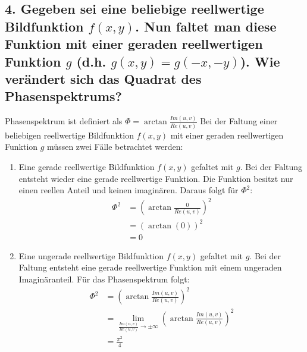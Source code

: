 \subsection*{4. Gegeben sei eine beliebige reellwertige Bildfunktion $f(x,y)$. Nun faltet man diese Funktion mit einer geraden reellwertigen Funktion $g$ (d.h. $g(x,y)=g(-x,-y)$). Wie ver\"andert sich das Quadrat des Phasenspektrums?}
Phasenspektrum ist definiert als $\Phi = \arctan{\frac{Im(u,v)}{Re(u,v)}}$
Bei der Faltung einer beliebigen reellwertige Bildfunktion $f(x,y)$ mit einer geraden reellwertigen Funktion $g$ m\"ussen zwei F\"alle betrachtet werden:
\begin{enumerate}
\item Eine gerade reellwertige Bildfunktion $f(x,y)$ gefaltet mit $g$. Bei der Faltung entsteht wieder eine gerade reellwertige Funktion. Die Funktion besitzt nur einen reellen Anteil und keinen imagin\"aren. Daraus folgt f\"ur $\Phi^2$:\\
\begin{align*}
\Phi^2 &= (\arctan{\frac{0}{Re(u,v)}})^2\\
&= (\arctan(0))^2\\
&= 0
\end{align*}
\item Eine ungerade reellwertige Bildfunktion $f(x,y)$ gefaltet mit $g$. Bei der Faltung entsteht eine gerade reellwertige Funktion mit einem ungeraden Imagin\"aranteil. F\"ur das Phasenspektrum folgt:\\
\begin{align*}
\Phi^2 &= (\arctan{\frac{Im(u,v)}{Re(u,v)}})^2\\
&= \lim_{\frac{Im(u,v)}{Re(u,v)} \rightarrow \pm\infty} (\arctan{\frac{Im(u,v)}{Re(u,v)}})^2\\
&= \frac{\pi^2}{4}
\end{align*}
\end{enumerate}